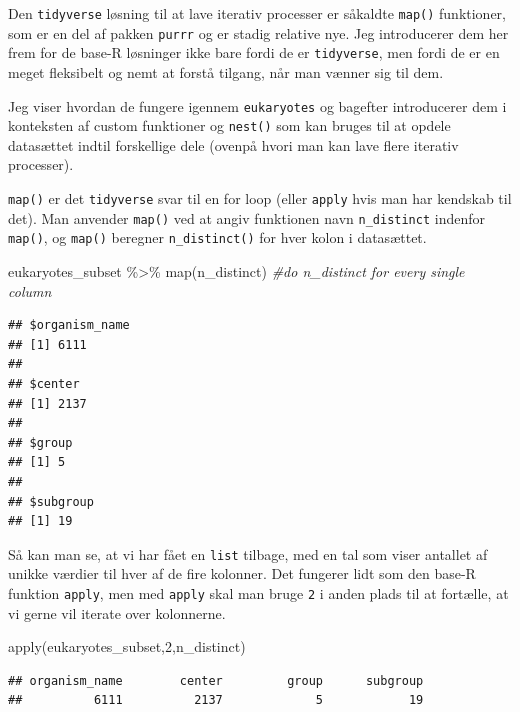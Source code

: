 \documentclass[
]{book}
\newenvironment{Shaded}{\begin{snugshade}}{\end{snugshade}}
\newcommand{\CommentTok}[1]{\textcolor[rgb]{0.56,0.35,0.01}{\textit{#1}}}
\newcommand{\DecValTok}[1]{\textcolor[rgb]{0.00,0.00,0.81}{#1}}
\newcommand{\FunctionTok}[1]{\textcolor[rgb]{0.00,0.00,0.00}{#1}}
\newcommand{\NormalTok}[1]{#1}
\newcommand{\SpecialCharTok}[1]{\textcolor[rgb]{0.00,0.00,0.00}{#1}}
\begin{document}
Den \texttt{tidyverse} løsning til at lave iterativ processer er såkaldte \texttt{map()} funktioner, som er en del af pakken \texttt{purrr} og er stadig relative nye. Jeg introducerer dem her frem for de base-R løsninger ikke bare fordi de er \texttt{tidyverse}, men fordi de er en meget fleksibelt og nemt at forstå tilgang, når man vænner sig til dem.

Jeg viser hvordan de fungere igennem \texttt{eukaryotes} og bagefter introducerer dem i konteksten af custom funktioner og \texttt{nest()} som kan bruges til at opdele datasættet indtil forskellige dele (ovenpå hvori man kan lave flere iterativ processer).

\texttt{map()} er det \texttt{tidyverse} svar til en for loop (eller \texttt{apply} hvis man har kendskab til det). Man anvender \texttt{map()} ved at angiv funktionen navn \texttt{n\_distinct} indenfor \texttt{map()}, og \texttt{map()} beregner \texttt{n\_distinct()} for hver kolon i datasættet.

\begin{Shaded}
\begin{Highlighting}[]
\NormalTok{eukaryotes\_subset }\SpecialCharTok{\%\textgreater{}\%} \FunctionTok{map}\NormalTok{(n\_distinct) }\CommentTok{\#do \textquotesingle{}n\_distinct\textquotesingle{} for every single column}
\end{Highlighting}
\end{Shaded}

\begin{verbatim}
## $organism_name
## [1] 6111
## 
## $center
## [1] 2137
## 
## $group
## [1] 5
## 
## $subgroup
## [1] 19
\end{verbatim}

Så kan man se, at vi har fået en \texttt{list} tilbage, med en tal som viser antallet af unikke værdier til hver af de fire kolonner. Det fungerer lidt som den base-R funktion \texttt{apply}, men med \texttt{apply} skal man bruge \texttt{2} i anden plads til at fortælle, at vi gerne vil iterate over kolonnerne.

\begin{Shaded}
\begin{Highlighting}[]
\FunctionTok{apply}\NormalTok{(eukaryotes\_subset,}\DecValTok{2}\NormalTok{,n\_distinct)}
\end{Highlighting}
\end{Shaded}

\begin{verbatim}
## organism_name        center         group      subgroup 
##          6111          2137             5            19
\end{verbatim}
\end{document}
